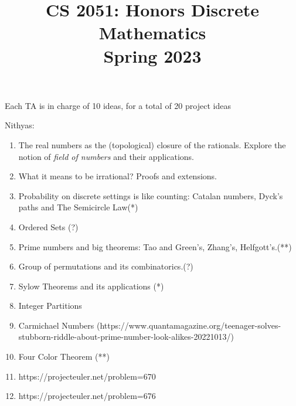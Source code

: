 \documentclass{article}
\title{\vspace{-1cm}CS 2051: Honors Discrete Mathematics \\Spring 2023}
\author{}
\date{}
\begin{document}
\maketitle

Each TA is in charge of 10 ideas, for a total of 20 project ideas

Nithyas:
\begin{enumerate}[label = \arabic*.]
    \item The real numbers as the (topological) closure of the rationals. Explore the notion of {\it field of numbers} and their applications. 
    \item What it means to be irrational? Proofs and extensions. %
    \item Probability on discrete settings is like counting: Catalan numbers, Dyck's paths and The Semicircle Law(*)  
    \item Ordered Sets (?)
    \item Prime numbers and big theorems: Tao and Green's, Zhang's, Helfgott's.(**) 
    \item Group of permutations and its combinatorics.(?)
    \item Sylow Theorems and its applications (*)
    \item Integer Partitions
    \item Carmichael Numbers (https://www.quantamagazine.org/teenager-solves-stubborn-riddle-about-prime-number-look-alikes-20221013/)
    \item Four Color Theorem (**)
    \item https://projecteuler.net/problem=670
    \item https://projecteuler.net/problem=676
\end{enumerate}

\pagebreak
\end{document}
